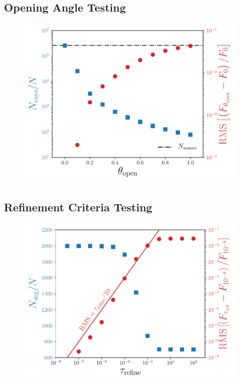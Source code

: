 \documentclass[fleq,usenatbib]{mnras}
\begin{document}
\subsection{Opening Angle Testing}
\begin{figure}
\includegraphics[width=1\linewidth]{Figures/opening_angle.pdf}
\caption{}
\label{fig:openangle}
\end{figure}
\subsection{Refinement Criteria Testing}
\begin{figure}
\includegraphics[width=1\linewidth]{Figures/refinement_criteria.pdf}
\caption{}
\label{fig:refcrit}
\end{figure}
\end{document}
